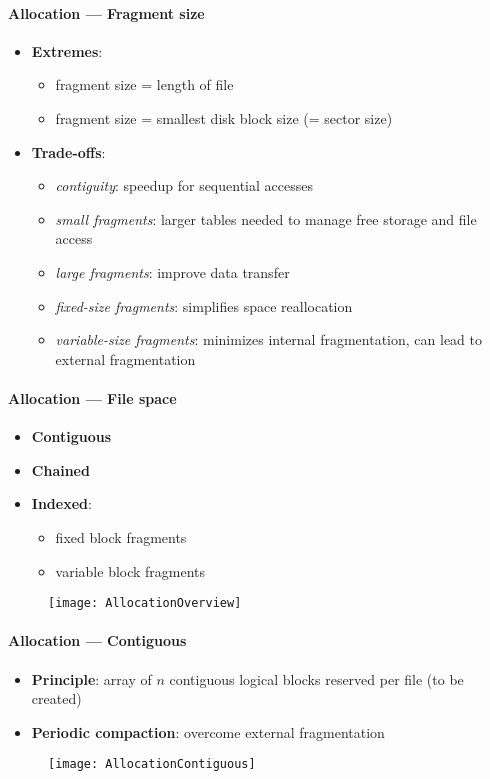 \paragraph{Allocation --- Fragment size}
\begin{itemize}
  \item \textbf{Extremes}:
  \begin{itemize}
    \item fragment size = length of file
    \item fragment size = smallest disk block size (= sector size)
  \end{itemize}
  \item \textbf{Trade-offs}:
  \begin{itemize}
    \item \emph{contiguity}: speedup for sequential accesses
    \item \emph{small fragments}: larger tables needed to manage free storage and file access
    \item \emph{large fragments}: improve data transfer
    \item \emph{fixed-size fragments}: simplifies space reallocation
    \item \emph{variable-size fragments}: minimizes internal fragmentation, can lead to external fragmentation
  \end{itemize}
\end{itemize}

\paragraph{Allocation --- File space}
\begin{itemize}
  \item \textbf{Contiguous}
  \item \textbf{Chained}
  \item \textbf{Indexed}:
  \begin{itemize}
    \item fixed block fragments
    \item variable block fragments
  \end{itemize}
\end{itemize}
\begin{figure}[h]\centering\label{AllocationOverview}\texttt{[image: AllocationOverview]}\end{figure}

\paragraph{Allocation --- Contiguous}
\begin{itemize}
  \item \textbf{Principle}: array of $ n $ contiguous logical blocks reserved per file (to be created)
  \item \textbf{Periodic compaction}: overcome external fragmentation
\end{itemize}
\begin{figure}[h]\centering\label{AllocationContiguous}\texttt{[image: AllocationContiguous]}\end{figure}

